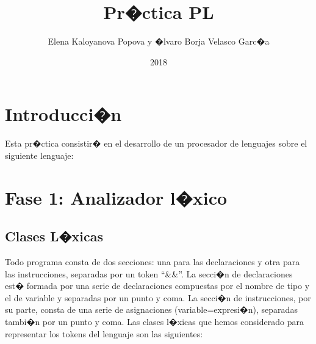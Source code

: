\documentclass[11pt,oneside,onecolumn,openany,spanish]{book}
\title{Pr�ctica PL}
\author{Elena Kaloyanova Popova y �lvaro Borja Velasco Garc�a}
\date{2018}
\begin{document}
\newcommand{\mystar}{{\fontfamily{lmr}\selectfont$\star$}}
\newcommand\tab[1][0.7cm]{\hspace*{#1}}

\maketitle
\tableofcontents %

\chapter{Introducci�n}

Esta pr�ctica consistir� en el desarrollo de un procesador de lenguajes sobre el siguiente lenguaje:

\chapter{Fase 1: Analizador l�xico}

\section{Clases L�xicas}
\label{cap2:sec:clases_lexicas}
Todo programa consta de dos secciones: una para las declaraciones y otra para las instrucciones, separadas por un token "`\&\&"'. La secci�n de declaraciones est� formada por una serie de declaraciones compuestas por el nombre de tipo y el de variable y separadas por un punto y coma. La secci�n de instrucciones, por su parte, consta de una serie de asignaciones (variable=expresi�n), separadas tambi�n por un punto y coma.
Las clases l�xicas que hemos considerado para representar los tokens del lenguaje son las siguientes:
\end{document}
